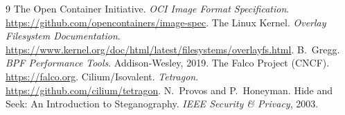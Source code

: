 \documentclass[sigconf,nonacm]{acmart}
\begin{document}
%
%
\begin{thebibliography}{9}
\small
{} The Open Container Initiative. \emph{OCI Image Format
Specification}. \url{https://github.com/opencontainers/image-spec}.
 The Linux Kernel. \emph{Overlay Filesystem Documentation}.
\url{https://www.kernel.org/doc/html/latest/filesystems/overlayfs.html}.
 B.~Gregg. \emph{BPF Performance Tools}. Addison-Wesley, 2019.
 The Falco Project (CNCF). \url{https://falco.org}.
 Cilium/Isovalent. \emph{Tetragon}.
\url{https://github.com/cilium/tetragon}.
 N.~Provos and P.~Honeyman. Hide and Seek: An Introduction to
Steganography. \emph{IEEE Security \& Privacy}, 2003.
\end{thebibliography}
\end{document}
